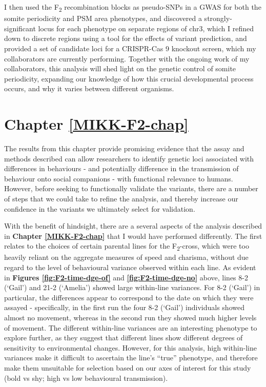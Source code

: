 \documentclass[
]{book}
\begin{document}
I then used the F\textsubscript{2} recombination blocks as pseudo-SNPs in a GWAS for both the somite periodicity and PSM area phenotypes, and discovered a strongly-significant locus for each phenotype on separate regions of chr3, which I refined down to discrete regions using a tool for the effects of variant prediction, and provided a set of candidate loci for a CRISPR-Cas 9 knockout screen, which my collaborators are currently performing. Together with the ongoing work of my collaborators, this analysis will shed light on the genetic control of somite periodicity, expanding our knowledge of how this crucial developmental process occurs, and why it varies between different organisms.

\hypertarget{chapter-refmikk-f2-chap}{%
\section*{Chapter \ref{MIKK-F2-chap}}\label{chapter-refmikk-f2-chap}}

The results from this chapter provide promising evidence that the assay and methods described can allow researchers to identify genetic loci associated with differences in behaviours - and potentially difference in the transmission of behaviour onto social companions - with functional relevance to humans. However, before seeking to functionally validate the variants, there are a number of steps that we could take to refine the analysis, and thereby increase our confidence in the variants we ultimately select for validation.

With the benefit of hindsight, there are a several aspects of the analysis described in \textbf{Chapter \ref{MIKK-F2-chap}} that I would have performed differently. The first relates to the choices of certain parental lines for the F\textsubscript{2}-cross, which were too heavily reliant on the aggregate measures of speed and charisma, without due regard to the level of behavioural variance observed within each line. As evident in \textbf{Figures \ref{fig:F2-time-dge-of}} and \textbf{\ref{fig:F2-time-dge-no}} above, lines \textcolor{8-2 (‘Gail’)_FF699C}{8-2 (‘Gail’)} and \textcolor{21-2 (‘Amelia’)_49B500}{21-2 (‘Amelia’)} showed large within-line variances. For \textcolor{8-2 (‘Gail’)_FF699C}{8-2 (‘Gail’)} in particular, the differences appear to correspond to the date on which they were assayed - specifically, in the first run the four \textcolor{8-2 (‘Gail’)_FF699C}{8-2 (‘Gail’)} individuals showed almost no movement, whereas in the second run they showed much higher levels of movement. The different within-line variances are an interesting phenotype to explore further, as they suggest that different lines show different degrees of sensitivity to environmental changes. However, for this analysis, high within-line variances make it difficult to ascertain the line's ``true'' phenotype, and therefore make them unsuitable for selection based on our axes of interest for this study (bold vs shy; high vs low behavioural transmission).
\end{document}
